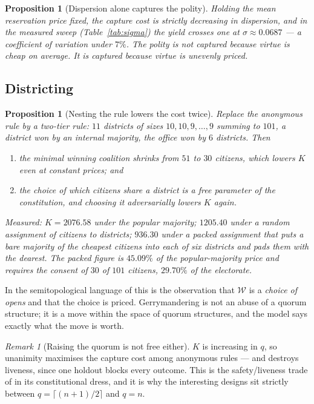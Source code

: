 \documentclass[11pt]{article}
\theoremstyle{plain}
\newtheorem{proposition}[theorem]{Proposition}
\theoremstyle{definition}
\theoremstyle{remark}
\newtheorem{remark}[theorem]{Remark}
\newcommand{\Win}{\mathcal{W}}
\begin{document}
\begin{proposition}[Dispersion alone captures the polity]
\label{prop:sigma}
Holding the mean reservation price fixed, the capture cost is strictly
decreasing in dispersion, and in the measured sweep
(Table~\ref{tab:sigma}) the yield crosses one at $\sigma \approx 0.0687$ ---
a coefficient of variation under $7\%$. The polity is not captured because
virtue is cheap on average. It is captured because virtue is
\emph{unevenly priced}.
\end{proposition}

\subsection{Districting}

\begin{proposition}[Nesting the rule lowers the cost twice]
\label{prop:district}
Replace the anonymous rule by a two-tier rule: $11$ districts of sizes
$10,10,9,\dots,9$ summing to $101$, a district won by an internal majority, the
office won by $6$ districts. Then
\begin{enumerate}[label=(\alph*),leftmargin=2.2em]
\item the minimal winning coalition shrinks from $51$ to $30$ citizens, which
lowers $K$ even at constant prices; and
\item the choice of \emph{which} citizens share a district is a free parameter
of the constitution, and choosing it adversarially lowers $K$ again.
\end{enumerate}
Measured: $K = 2076.58$ under the popular majority; $1205.40$ under a random
assignment of citizens to districts; $936.30$ under a packed assignment that
puts a bare majority of the cheapest citizens into each of six districts and
pads them with the dearest. The packed figure is $45.09\%$ of the
popular-majority price and requires the consent of $30$ of $101$ citizens,
$29.70\%$ of the electorate.
\end{proposition}

In the semitopological language of \cite{quorum} this is the observation that
$\Win$ is a \emph{choice of opens} and that the choice is priced. Gerrymandering
is not an abuse of a quorum structure; it is a move within the space of quorum
structures, and the model says exactly what the move is worth.

\begin{remark}[Raising the quorum is not free either]
$K$ is increasing in $q$, so unanimity maximises the capture cost among
anonymous rules --- and destroys liveness, since one holdout blocks every
outcome. This is the safety/liveness trade of \cite[\S11]{quorum} in its
constitutional dress, and it is why the interesting designs sit strictly between
$q = \lceil (n+1)/2\rceil$ and $q = n$.
\end{remark}
\end{document}
